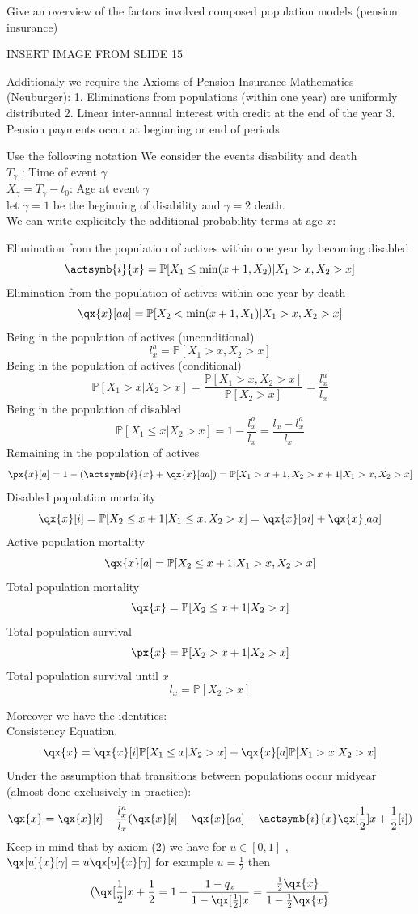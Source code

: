 \documentclass[11pt,a4paper,twoside]{article}
\begin{document}
Give an overview of the factors involved composed population models (pension insurance)

INSERT IMAGE FROM SLIDE 15

Additionaly we require the Axioms of Pension Insurance Mathematics (Neuburger):
1. Eliminations from populations (within one year) are uniformly distributed
2. Linear inter-annual interest with credit at the end of the year
3. Pension payments occur at beginning or end of periods


Use the following notation 
We consider the events disability and death \\
\( T_\gamma \) : Time of event \( \gamma \) \\
\( X_\gamma = T_\gamma - t_0 \): Age at event  \( \gamma \) \\
let \( \gamma = 1 \) be the beginning of disability and \( \gamma = 2 \) death. \\
We can write explicitely the additional probability terms at age \( x \):

Elimination from the population of actives within one year by becoming disabled
\[ \actsymb{i}{x} = \mathbb{P}[X_1 \leq \min(x+1, X_2) | X_1 > x, X_2 > x] \]
Elimination from the population of actives within one year by death
\[ \qx{x}[aa] = \mathbb{P}[X_2 < \min(x+1, X_1) | X_1 > x, X_2 > x ] \]
Being in the population of actives (unconditional)
\[ l^a_x = \mathbb{P}[X_1 > x, X_2 > x] \]
Being in the population of actives (conditional)
\[ \mathbb{P}[X_1 > x|X_2 > x] = \frac{\mathbb{P}[X_1 > x, X_2 > x]}{ \mathbb{P}[X_2 > x] } = \frac{l^a_x}{l_x} \]
Being in the population of disabled 
\[ \mathbb{P}[X_1 \leq x | X_2 > x] = 1 - \frac{l^a_x}{l_x} = \frac{l_x - l_x^a}{l_x} \]
Remaining in the population of actives
\[ \px{x}[a] = 1 - (\actsymb{i}{x} + \qx{x}[aa]) = \mathbb{P}[X_1 > x+1, X_2 > x+1|X_1 > x, X_2 > x] \]
Disabled population mortality
\[ \qx{x}[i] = \mathbb{P}[X_2 \leq x+1|X_1 \leq x, X_2 > x] = \qx{x}[ai] + \qx{x}[aa] \]
Active population mortality
\[ \qx{x}[a] = \mathbb{P}[X_2 \leq x+1|X_1 > x, X_2 > x] \]
Total population mortality
\[ \qx{x} = \mathbb{P}[X_2 \leq x+1|X_2 > x] \]
Total population survival
\[ \px{x} = \mathbb{P}[X_2 > x+1|X_2 > x] \]
Total population survival until \( x \)
\[ l_x = \mathbb{P}[X_2 > x] \]

Moreover we have the identities: \\
Consistency Equation.
\[ \qx{x} = \qx{x}[i] \mathbb{P}[X_1 \leq x | X_2 > x] + \qx{x}[a] \mathbb{P}[X_1 > x|X_2 > x] \]
Under the assumption that transitions between populations occur midyear (almost done exclusively in practice):
\[ \qx{x} = \qx{x}[i] - \frac{l^a_x}{l_x}(\qx{x}[i] - \qx{x}[aa] - \actsymb{i}{x} \qx[\frac{1}{2}]{x + \frac{1}{2}}[i])  \]
Keep in mind that by axiom (2) we have for \( u \in [0, 1] \) , \( \qx[u]{x}[\gamma] = u \qx[u]{x}[\gamma] \)
for example \( u = \frac{1}{2} \) then
\[( \qx[\frac{1}{2}]{x + \frac{1}{2}} = 1 - \frac{1 - q_x}{1 - \qx[\frac{1}{2}]{x}} = \frac{\frac{1}{2}\qx{x}}{1 - \frac{1}{2}\qx{x}} \]
\end{document}
